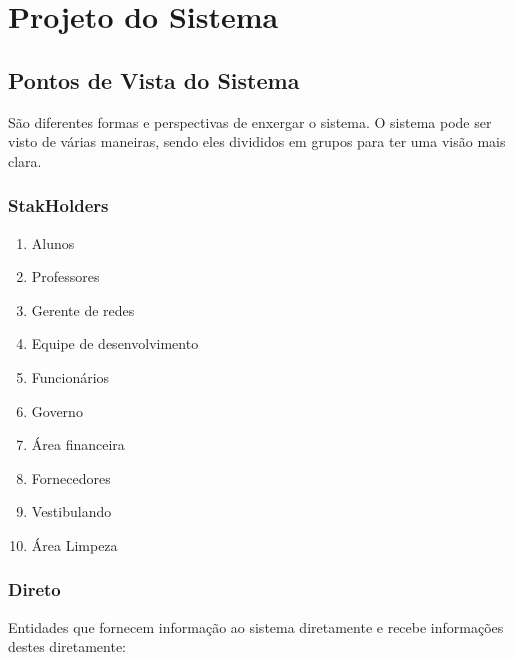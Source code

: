 

\chapter{Projeto do Sistema}

\section{Pontos de Vista do Sistema}

São diferentes formas e perspectivas de enxergar o sistema. O sistema pode ser visto de várias maneiras, sendo eles divididos em grupos para ter uma visão mais clara.

\subsection{StakHolders}

\begin{enumerate}
\item Alunos
\item Professores
\item Gerente de redes
\item Equipe de desenvolvimento
\item Funcionários
\item Governo
\item Área financeira
\item Fornecedores
\item Vestibulando 
\item Área Limpeza
\end{enumerate}

\subsection {Direto}

Entidades que fornecem informação ao sistema diretamente e recebe informações destes diretamente:


